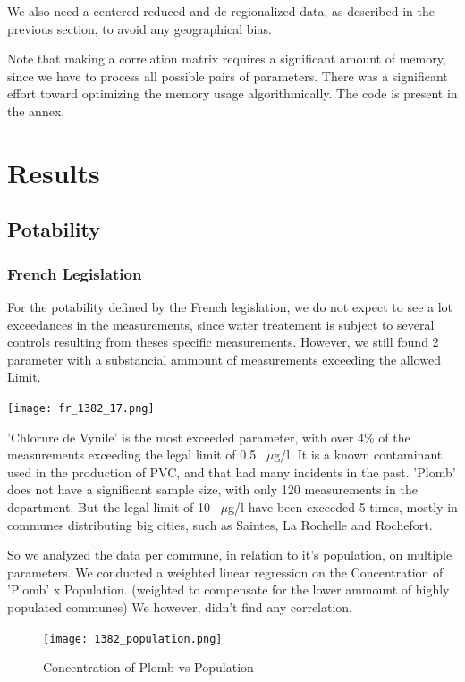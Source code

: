 \documentclass{article}
\begin{document}
We also need a centered reduced and de-regionalized data, as described in the previous section, to avoid any geographical bias.

Note that making a correlation matrix requires a significant amount of memory,
since we have to process all possible pairs of parameters.
There was a significant effort toward optimizing the memory usage algorithmically. The code is present in the annex.

\newpage
\section{Results}

\subsection{Potability}
\subsubsection{French Legislation}
For the potability defined by the French legislation, we do not expect to see a lot exceedances in the measurements, since water treatement is subject to several controls resulting from theses specific measurements.
However, we still found 2 parameter with a substancial ammount of measurements exceeding the allowed Limit.

\centerline{\texttt{[image: fr\_1382\_17.png]}}

'Chlorure de Vynile' is the most exceeded parameter, with over 4\% of the measurements exceeding the legal limit of 0.5 ~$\mu$g/l. It is a known contaminant, used in the production of PVC, and that had many incidents in the past.
'Plomb' does not have a significant sample size, with only 120 measurements in the department. But the legal limit of 10 ~$\mu$g/l have been exceeded 5 times, mostly in communes distributing big cities, such as Saintes, La Rochelle and Rochefort.

So we analyzed the data per commune, in relation to it's population, on multiple parameters.
We conducted a weighted linear regression on the Concentration of 'Plomb' x Population. (weighted to compensate for the lower ammount of highly populated communes)
We however, didn't find any correlation.

\newpage
\begin{figure}[H]
    \centering
    \texttt{[image: 1382\_population.png]}
    \caption*{Concentration of Plomb vs Population}
\end{figure}
\end{document}
